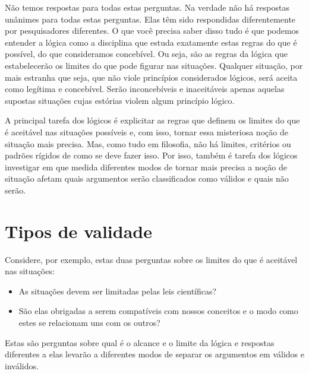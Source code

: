 Não temos respostas para todas estas perguntas.
Na verdade não há respostas unânimes para todas estas perguntas.
Elas têm sido respondidas diferentemente por pesquisadores diferentes.
O que você precisa saber disso tudo é que podemos entender a lógica como a disciplina que estuda exatamente estas regras do que é possível, do que consideramos concebível.
Ou seja, são as regras da lógica que estabelecerão os limites do que pode figurar nas situações.
Qualquer situação, por mais estranha que seja, que não viole princípios considerados lógicos, será aceita como legítima e concebível.
Serão inconcebíveis e inaceitáveis apenas aquelas supostas situações cujas estórias violem algum princípio lógico.


A principal tarefa dos lógicos é explicitar as regras que definem os limites do que é aceitável nas situações possíveis e, com isso, tornar essa misteriosa noção de situação mais precisa.
Mas, como tudo em filosofia, não há limites, critérios ou padrões rígidos de como se deve fazer isso.
Por isso, também é tarefa dos lógicos investigar em que medida diferentes modos de tornar mais precisa a noção de situação afetam quais argumentos serão classificados como válidos e quais não serão.

\section{Tipos de validade}
Considere, por exemplo, estas duas perguntas sobre os limites do que é aceitável nas situações:
\begin{itemize}
	\item As situações devem ser limitadas pelas leis científicas?
	\item São elas obrigadas a serem compatíveis com nossos conceitos e o modo como estes se relacionam uns com os outros?
\end{itemize}
Estas são perguntas sobre qual é o alcance e o limite da lógica e respostas diferentes a elas  levarão a diferentes modos de separar os argumentos em válidos e inválidos.

